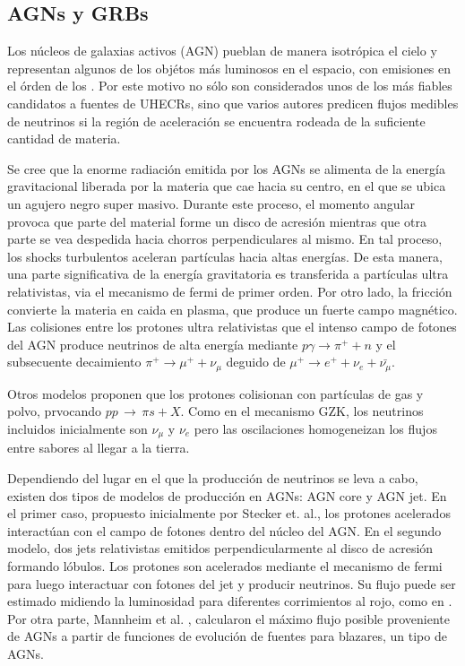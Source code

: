 	\subsection{AGNs y GRBs}
	Los n\'ucleos de galaxias activos (AGN) pueblan de manera isotr\'opica el cielo y representan algunos de los obj\'etos m\'as luminosos en el espacio, con emisiones en el \'orden de los \cite{cite:GHZ}.
	Por este motivo no s\'olo son considerados unos de los m\'as fiables candidatos a fuentes de UHECRs, sino que varios autores predicen flujos medibles de neutrinos si la regi\'on de aceleraci\'on se encuentra rodeada de la suficiente cantidad de materia.
	
	Se cree que la enorme radiaci\'on emitida por los AGNs se alimenta de la energ\'ia gravitacional liberada por la materia que cae hacia su centro, en el que se ubica un agujero negro super masivo.
	Durante este proceso, el momento angular provoca que parte del material forme un disco de acresi\'on mientras que otra parte se vea despedida hacia chorros perpendiculares al mismo.
	En tal proceso, los shocks turbulentos aceleran part\'iculas hacia altas energ\'ias.
	De esta manera, una parte significativa de la energ\'ia gravitatoria es transferida a part\'iculas ultra relativistas, via el mecanismo de fermi de primer orden\cite{cite:Fermi1}.
	Por otro lado, la fricci\'on convierte la materia en caida en plasma, que produce un fuerte campo magn\'etico.
	Las colisiones entre los protones ultra relativistas que el intenso campo de fotones del AGN produce neutrinos de alta energ\'ia mediante $p\gamma \rightarrow \pi^{+} + n$ y el subsecuente decaimiento $\pi^{+} \rightarrow \mu^{+} + \nu_{\mu}$ deguido de $\mu^{+} \rightarrow e^{+} + \nu_{e} + \bar{\nu_{\mu}}$.
	
	Otros modelos proponen que los protones colisionan con part\'iculas de gas y polvo, prvocando $pp\,\rightarrow\,\pi s + X$.
	Como en el mecanismo GZK, los neutrinos incluidos inicialmente son $\nu_\mu$ y $\nu_e$ pero las oscilaciones homogeneizan los flujos entre sabores al llegar a la tierra.
	
	Dependiendo del lugar en el que la producci\'on de neutrinos se leva a cabo, existen dos tipos de modelos de producci\'on en AGNs: AGN core y AGN jet.
	En el primer caso, propuesto inicialmente por Stecker et. al.\cite{cite:nuAGN}, los protones acelerados interact\'uan con el campo de fotones dentro del n\'ucleo del AGN. 
	En el segundo modelo, dos jets relativistas emitidos perpendicularmente al disco de acresi\'on formando l\'obulos. 
	Los protones son acelerados mediante el mecanismo de fermi para luego interactuar con fotones del jet y producir neutrinos.
	Su flujo puede ser estimado midiendo la luminosidad para diferentes corrimientos al rojo, como en \cite{cite:Protheroe1}. Por otra parte, Mannheim et al. \cite{cite:Mannheim1}, calcularon el m\'aximo flujo posible proveniente de AGNs a partir de funciones de evoluci\'on de fuentes para blazares, un tipo de AGNs.
	
